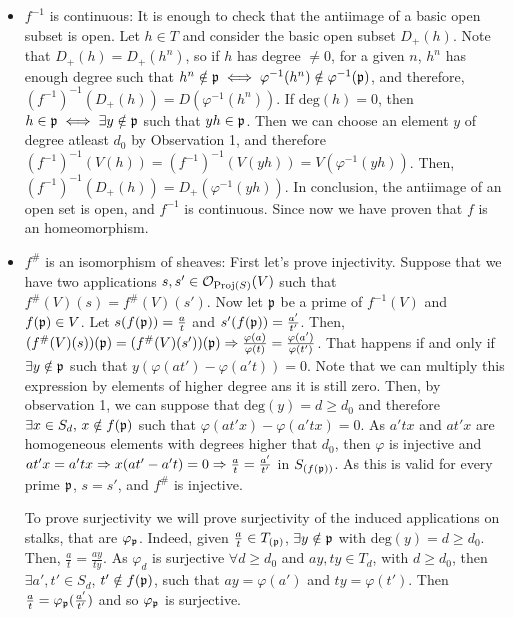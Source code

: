 \begin{sol}
\begin{enumerate}[label=\alph*)]
\begin{itemize}
			\item $f^{-1}$ is continuous: It is enough to check that the antiimage of a basic open subset is open. Let $h \in T$ and consider the basic open subset $D_+(h)$. Note that $D_+(h) = D_+(h^n)$, so if $h$ has degree $\neq 0$, for a given $n$, $h^n$ has enough degree such that $h^n \notin \mathfrak{p} \iff \varphi^{-1}(h^n) \notin \varphi^{-1}(\mathfrak{p})$, and therefore, $(f^{-1})^{-1}(D_+(h)) = D(\varphi^{-1}(h^n))$. If $\mathrm{deg}(h) = 0$, then $h \in \mathfrak{p} \iff \exists y \notin \mathfrak{p}$ such that $yh \in \mathfrak{p}$. Then we can choose an element $y$ of degree atleast $d_0$ by Observation 1, and therefore $(f^{-1})^{-1}(V(h)) = (f^{-1})^{-1}(V(yh)) = V(\varphi^{-1}(yh))$. Then, $(f^{-1})^{-1}(D_+(h)) = D_+(\varphi^{-1}(yh))$. In conclusion, the antiimage of an open set is open, and $f^{-1}$ is continuous.
			Since now we have proven that $f$ is an homeomorphism. 

			\item $f^{\#}$ is an isomorphism of sheaves: First let's prove injectivity. Suppose that we have two applications $s,s' \in \mathcal{O}_{\mathrm{Proj}(S)}(V)$ such that $f^{\#}(V)(s) = f^{\#}(V)(s')$. Now let $\mathfrak{p}$ be a prime of $f^{-1}(V)$ and $f(\mathfrak{p}) \in V$. Let $s(f(\mathfrak{p})) = \frac{a}{t}$ and $s'(f(\mathfrak{p})) = \frac{a'}{t'}$. Then, $(f^{\#}(V)(s))(\mathfrak{p}) =  (f^{\#}(V)(s'))(\mathfrak{p}) \Rightarrow \frac{\varphi(a)}{\varphi(t)} = \frac{\varphi(a')}{\varphi(t')}$. That happens if and only if $\exists y \notin \mathfrak{p}$ such that $y(\varphi(at')-\varphi(a't)) = 0$. Note that we can multiply this expression by elements of higher degree ans it is still zero. Then, by observation 1, we can suppose that $\mathrm{deg}(y) = d \geq d_0$ and therefore $\exists x \in S_d, \, x \notin f(\mathfrak{p})$ such that $\varphi(at'x)-\varphi(a'tx) = 0$. As $a'tx$ and $at'x$ are homogeneous elements with degrees higher that $d_0$, then $\varphi$ is injective and $at'x = a'tx \Rightarrow x(at'-a't) = 0 \Rightarrow \frac{a}{t} = \frac{a'}{t'}$ in $S_{(f(\mathfrak{p}))}$. As this is valid for every prime $\mathfrak{p}$, $s = s'$, and $f^{\#}$ is injective. 

			To prove surjectivity we will prove surjectivity of the induced applications on stalks, that are $\varphi_{\mathfrak{p}}$. Indeed, given $\frac{a}{t} \in T_{(\mathfrak{p})}$, $\exists y \notin \mathfrak{p}$ with $\mathrm{deg}(y) = d \geq d_0$. Then, $\frac{a}{t} = \frac{ay}{ty}$. As $\varphi_d$ is surjective $\forall d \geq d_0$ and $ay, ty \in T_d$, with $d \geq d_0$, then $\exists a', t' \in S_d$, $t' \notin f(\mathfrak{p})$, such that $ay = \varphi(a')$ and $ty = \varphi(t')$. Then $\frac{a}{t} = \varphi_{\mathfrak{p}}(\frac{a'}{t'})$ and so $\varphi_{\mathfrak{p}}$ is surjective.
		\end{itemize}


\end{enumerate}
\end{sol}
